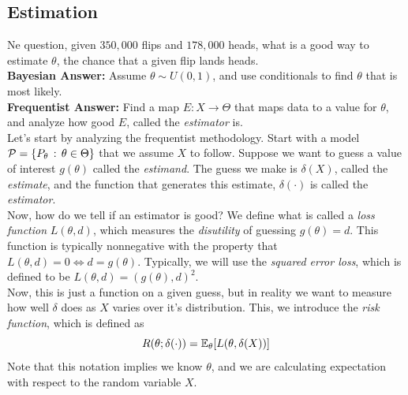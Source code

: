 \subsection*{Estimation}

Ne question, given $350,000$ flips and $178,000$ heads, what is a good way to estimate $\theta$, the chance that a given flip lands heads.\\

\textbf{Bayesian Answer:} Assume $\theta \sim U(0, 1)$, and use conditionals to find $\theta$ that is most likely.\\

\textbf{Frequentist Answer:} Find a map $E : X \to \Theta$ that maps data to a value for $\theta$, and analyze how good $E$, called the \emph{estimator} is.\\

Let's start by analyzing the frequentist methodology. Start with a model $\mathcal{P} = \{P_{\theta} \, :\, \theta \in \Theta\}$ that we assume $X$ to follow. Suppose we want to guess a value of interest $g(\theta)$ called the \emph{estimand}. The guess we make is $\delta(X)$, called the \emph{estimate}, and the function that generates this estimate, $\delta(\cdot)$ is called the \emph{estimator}.\\

Now, how do we tell if an estimator is good? We define what is called a \emph{loss function} $L(\theta, d)$, which measures the \emph{disutility} of guessing $g(\theta) = d$. This function is typically nonnegative with the property that $L(\theta, d) = 0 \iff d = g(\theta)$. Typically, we will use the \emph{squared error loss}, which is defined to be $L(\theta, d) = (g(\theta), d)^2$.\\

Now, this is just a function on a given guess, but in reality we want to measure how well $\delta$ does as $X$ varies over it's distribution. This, we introduce the \emph{risk function}, which is defined as
\[ R(\theta; \delta(\cdot)) = \mathbb{E}_{\theta}[L(\theta, \delta(X))] \]
Note that this notation implies we know $\theta$, and we are calculating expectation with respect to the random variable $X$. 